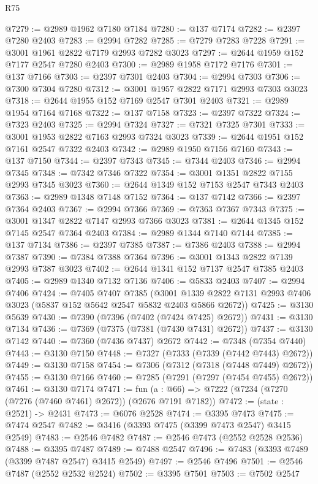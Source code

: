 \begin{lexlean}{R75}
\begin{coremodule}
@7279 := @2989 @1962 @7180 @7184
@7280 := @137 @7174
@7282 := @2397 @7280 @2403
@7283 := @2994 @7282
@7285 := @7279 @7283 @7228
@7291 := @3001 @1961 @2822 @7179 @2993 @7282 @3023
@7297 := @2644 @1959 @152 @7177 @2547 @7280 @2403
@7300 := @2989 @1958 @7172 @7176
@7301 := @137 @7166
@7303 := @2397 @7301 @2403
@7304 := @2994 @7303
@7306 := @7300 @7304 @7280
@7312 := @3001 @1957 @2822 @7171 @2993 @7303 @3023
@7318 := @2644 @1955 @152 @7169 @2547 @7301 @2403
@7321 := @2989 @1954 @7164 @7168
@7322 := @137 @7158
@7323 := @2397 @7322
@7324 := @7323 @2403
@7325 := @2994 @7324
@7327 := @7321 @7325 @7301
@7333 := @3001 @1953 @2822 @7163 @2993 @7324 @3023
@7339 := @2644 @1951 @152 @7161 @2547 @7322 @2403
@7342 := @2989 @1950 @7156 @7160
@7343 := @137 @7150
@7344 := @2397 @7343
@7345 := @7344 @2403
@7346 := @2994 @7345
@7348 := @7342 @7346 @7322
@7354 := @3001 @1351 @2822 @7155 @2993 @7345 @3023
@7360 := @2644 @1349 @152 @7153 @2547 @7343 @2403
@7363 := @2989 @1348 @7148 @7152
@7364 := @137 @7142
@7366 := @2397 @7364 @2403
@7367 := @2994 @7366
@7369 := @7363 @7367 @7343
@7375 := @3001 @1347 @2822 @7147 @2993 @7366 @3023
@7381 := @2644 @1345 @152 @7145 @2547 @7364 @2403
@7384 := @2989 @1344 @7140 @7144
@7385 := @137 @7134
@7386 := @2397 @7385
@7387 := @7386 @2403
@7388 := @2994 @7387
@7390 := @7384 @7388 @7364
@7396 := @3001 @1343 @2822 @7139 @2993 @7387 @3023
@7402 := @2644 @1341 @152 @7137 @2547 @7385 @2403
@7405 := @2989 @1340 @7132 @7136
@7406 := @5833 @2403
@7407 := @2994 @7406
@7424 := @7405
    @7407
    @7385
    (@3001 @1339 @2822 @7131 @2993 @7406 @3023 (@5837 @152 @5642 @2547 @5832 @2403 @5866 @2672))
@7425 := @3130 @5639
@7430 := @7390 (@7396 (@7402 (@7424 @7425) @2672))
@7431 := @3130 @7134
@7436 := @7369 (@7375 (@7381 (@7430 @7431) @2672))
@7437 := @3130 @7142
@7440 := @7360 (@7436 @7437) @2672
@7442 := @7348 (@7354 @7440)
@7443 := @3130 @7150
@7448 := @7327 (@7333 (@7339 (@7442 @7443) @2672))
@7449 := @3130 @7158
@7454 := @7306 (@7312 (@7318 (@7448 @7449) @2672))
@7455 := @3130 @7166
@7460 := @7285 (@7291 (@7297 (@7454 @7455) @2672))
@7461 := @3130 @7174
@7471 := fun (a : @66) => @7222 (@7234 (@7270 (@7276 (@7460 @7461) @2672)) (@2676 @7191 @7182))
@7472 := (state : @2521) -> @2431
@7473 := @6076 @2528
@7474 := @3395 @7473
@7475 := @7474 @2547
@7482 := @3416 (@3393 @7475 (@3399 @7473 @2547) @3415 @2549)
@7483 := @2546 @7482
@7487 := @2546 @7473 (@2552 @2528 @2536)
@7488 := @3395 @7487
@7489 := @7488 @2547
@7496 := @7483 (@3393 @7489 (@3399 @7487 @2547) @3415 @2549)
@7497 := @2546 @7496
@7501 := @2546 @7487 (@2552 @2532 @2524)
@7502 := @3395 @7501
@7503 := @7502 @2547

\end{coremodule}
\end{lexlean}
